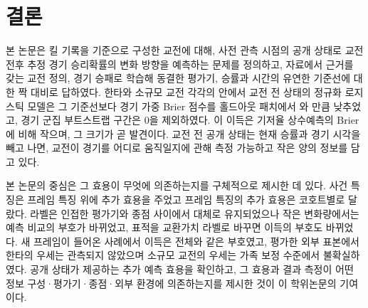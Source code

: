 \section{결론}
\label{sec:disc-conclusion}

본 논문은 킬 기록을 기준으로 구성한 교전에 대해, 사전 관측 시점의 공개 상태로 교전 전후 추정 경기 승리확률의 변화 방향을 예측하는 문제를 정의하고, 자료에서 근거를 갖는 교전 정의, 경기 승패로 학습해 동결한 평가기, 승률과 시간의 유연한 기준선에 대한 짝 대비로 답하였다. 한타와 소규모 교전 각각의 안에서 교전 전 상태의 정규화 로지스틱 모델은 그 기준선보다 경기 가중 Brier 점수를 홀드아웃 패치에서 \dBrierT{}와 \dBrierS{}만큼 낮추었고, 경기 군집 부트스트랩 구간은 0을 제외하였다. 이 이득은 기저율 상수예측의 Brier에 비해 작으며, 그 크기가 곧 발견이다. 교전 전 공개 상태는 현재 승률과 경기 시각을 빼고 나면, 교전이 경기를 어디로 움직일지에 관해 측정 가능하고 작은 양의 정보를 담고 있다.

본 논문의 중심은 그 효용이 무엇에 의존하는지를 구체적으로 제시한 데 있다. 사건 특징은 프레임 특징 위에 추가 효용을 주었고 프레임 특징의 추가 효용은 코호트별로 달랐다. 라벨은 인접한 평가기와 종점 사이에서 대체로 유지되었으나 작은 변화량에서는 예측 비교의 부호가 바뀌었고, 표적을 교환가치 라벨로 바꾸면 이득의 부호도 바뀌었다. 새 프레임이 들어온 사례에서 이득은 전체와 같은 부호였고, 평가한 외부 표본에서 한타의 우세는 관측되지 않았으며 소규모 교전의 우세는 가족 보정 수준에서 불확실하였다. 공개 상태가 제공하는 추가 예측 효용을 확인하고, 그 효용과 결과 측정이 어떤 정보 구성·평가기·종점·외부 환경에 의존하는지를 제시한 것이 이 학위논문의 기여이다.

